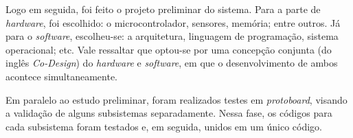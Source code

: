 Logo em seguida, foi feito o projeto preliminar do sistema. Para a parte de \textit{hardware}, foi escolhido: o microcontrolador, sensores, memória; entre outros. Já para o \textit{software}, escolheu-se: a arquitetura, linguagem de programação, sistema operacional; etc. Vale ressaltar que optou-se por uma concepção conjunta (do inglês \textit{Co-Design}) do \textit{hardware} e \textit{software}, em que o desenvolvimento de ambos acontece simultaneamente.

Em paralelo ao estudo preliminar, foram realizados testes em \textit{protoboard}, visando a validação de alguns subsistemas separadamente. Nessa fase, os códigos para cada subsistema foram testados e, em seguida, unidos em um único código.

